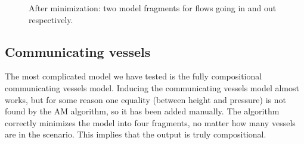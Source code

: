 \documentclass{article} %
\begin{document}
\begin{figure}[ht]
\centering
{}
\caption{After minimization: two model fragments for flows going in and out respectively.}
\label{sb_frags}
\end{figure}

\subsection{Communicating vessels} 

The most complicated model we have tested is the fully compositional
communicating vessels model. Inducing the communicating vessels model almost
works, but for some reason one equality (between height and pressure) is not
found by the AM algorithm, so it has been added manually.  The algorithm
correctly minimizes the model into four fragments, no matter how many vessels
are in the scenario. This implies that the output is truly compositional.
\end{document}
